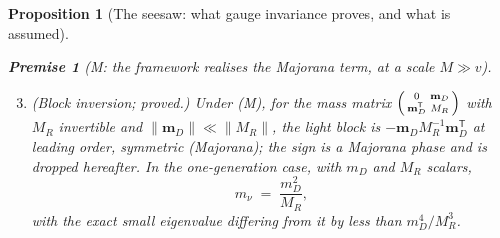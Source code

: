 \documentclass[11pt]{article}
\newtheorem{proposition}[theorem]{Proposition}
\theoremstyle{definition}
\newtheorem{premise}[theorem]{Premise}
\theoremstyle{plain}
\providecommand{\mD}{}\renewcommand{\mD}{\mathbf{m}_{D}}
\begin{document}
\begin{proposition}[The seesaw: what gauge invariance proves, and what is assumed]
\begin{premise}[M: the framework realises the Majorana term, at a scale $M \gg v$]
\end{premise}
\begin{enumerate}
\setcounter{enumi}{2}
\item \emph{(Block inversion; proved.)} Under (M), for the mass matrix $\begin{psmallmatrix} 0 & \mD \\ \mD^{\mathsf{T}} & M_{R}\end{psmallmatrix}$ with $M_{R}$ invertible and $\|\mD\| \ll \|M_{R}\|$, the light block is $-\mD M_{R}^{-1}\mD^{\mathsf{T}}$ at leading order, symmetric (Majorana); the sign is a Majorana phase and is dropped hereafter. In the one-generation case, with $m_{D}$ and $M_{R}$ scalars,
\begin{equation}
m_{\nu} \;=\; \frac{m_{D}^{2}}{M_{R}} ,
\end{equation}
with the exact small eigenvalue differing from it by less than $m_{D}^{4}/M_{R}^{3}$.
\end{enumerate}
\end{proposition}
\end{document}

